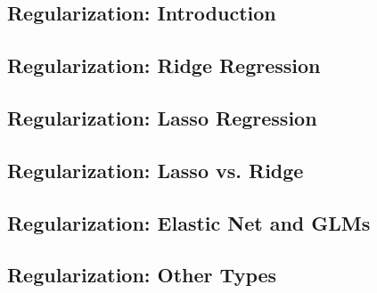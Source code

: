 


\subsection{Regularization: Introduction}


\subsection{Regularization: Ridge Regression}


\subsection{Regularization: Lasso Regression}


\subsection{Regularization: Lasso vs. Ridge}


\subsection{Regularization: Elastic Net and GLMs}


%

\subsection{Regularization: Other Types}



